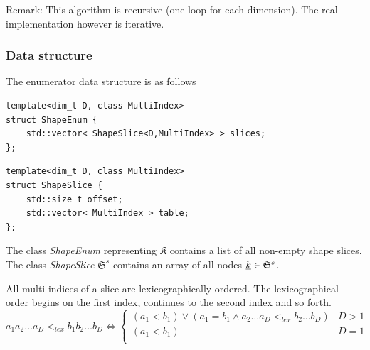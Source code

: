 \documentclass{article}
\def\classname#1{\textit{#1}}
\begin{document}
Remark: This algorithm is recursive (one loop for each dimension).
The real implementation however is iterative.

\subsubsection{Data structure}

The enumerator data structure is as follows

\begin{verbatim}
template<dim_t D, class MultiIndex>
struct ShapeEnum {
    std::vector< ShapeSlice<D,MultiIndex> > slices;
};
\end{verbatim}

\begin{verbatim}
template<dim_t D, class MultiIndex>
struct ShapeSlice {
    std::size_t offset;
    std::vector< MultiIndex > table;
};
\end{verbatim}

The class \classname{ShapeEnum} representing \(\mathfrak{K}\) contains a list
of all non-empty shape slices. The class \classname{ShapeSlice}
\(\mathfrak{S}^s\) contains an array of all nodes \(\underline{k} \in \mathfrak{S}^s\).

All multi-indices of a slice are lexicographically ordered.
The lexicographical order begins on the first index, continues to the second index and so forth.
\begin{equation}
  \label{eq:lexicographical_order}
  a_1a_2\dots a_D <_{lex}b_1b_2\dots b_D \iff
  \begin{cases}
    (a_1 < b_1) \lor (a_1 = b_1 \land a_2\dots a_D <_{lex} b_2\dots b_D) & D > 1 \\
    (a_1 < b_1) & D = 1 \\
  \end{cases}
\end{equation}
\end{document}
